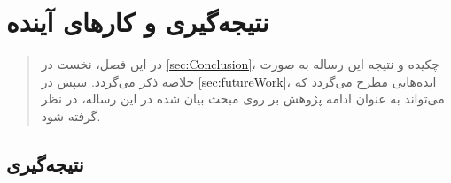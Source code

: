 \chapter{نتیجه‌گیری و کارهای آینده}
\label{chap:futureWork}
\begin{abstract}
در این فصل، نخست در
\autoref{sec:Conclusion}،
چکیده و نتیجه این رساله به صورت خلاصه ذکر می‌گردد. سپس در 
\autoref{sec:futureWork}،
ایده‌هایی مطرح می‌گردد که می‌تواند به عنوان ادامه پژوهش بر روی مبحث بیان شده در این رساله، در نظر گرفته شود.
\end{abstract}


\section{نتیجه‌گیری}
\label{sec:Conclusion}

